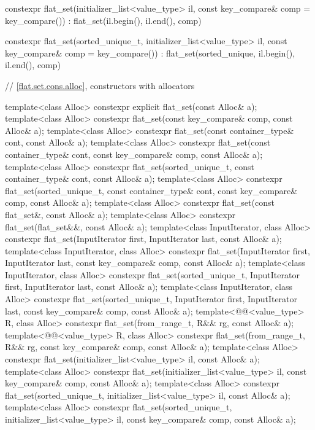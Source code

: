 \begin{codeblock}
{{    constexpr flat_set(initializer_list<value_type> il, const key_compare& comp = key_compare())
      : flat_set(il.begin(), il.end(), comp) { }

    constexpr flat_set(sorted_unique_t, initializer_list<value_type> il,
                       const key_compare& comp = key_compare())
      : flat_set(sorted_unique, il.begin(), il.end(), comp) { }

    // \ref{flat.set.cons.alloc}, constructors with allocators

    template<class Alloc>
      constexpr explicit flat_set(const Alloc& a);
    template<class Alloc>
      constexpr flat_set(const key_compare& comp, const Alloc& a);
    template<class Alloc>
      constexpr flat_set(const container_type& cont, const Alloc& a);
    template<class Alloc>
      constexpr flat_set(const container_type& cont, const key_compare& comp, const Alloc& a);
    template<class Alloc>
      constexpr flat_set(sorted_unique_t, const container_type& cont, const Alloc& a);
    template<class Alloc>
      constexpr flat_set(sorted_unique_t, const container_type& cont,
                         const key_compare& comp, const Alloc& a);
    template<class Alloc>
      constexpr flat_set(const flat_set&, const Alloc& a);
    template<class Alloc>
      constexpr flat_set(flat_set&&, const Alloc& a);
    template<class InputIterator, class Alloc>
      constexpr flat_set(InputIterator first, InputIterator last, const Alloc& a);
    template<class InputIterator, class Alloc>
      constexpr flat_set(InputIterator first, InputIterator last,
                         const key_compare& comp, const Alloc& a);
    template<class InputIterator, class Alloc>
      constexpr flat_set(sorted_unique_t, InputIterator first, InputIterator last,
                         const Alloc& a);
    template<class InputIterator, class Alloc>
      constexpr flat_set(sorted_unique_t, InputIterator first, InputIterator last,
                         const key_compare& comp, const Alloc& a);
    template<@@<value_type> R, class Alloc>
      constexpr flat_set(from_range_t, R&& rg, const Alloc& a);
    template<@@<value_type> R, class Alloc>
      constexpr flat_set(from_range_t, R&& rg, const key_compare& comp, const Alloc& a);
    template<class Alloc>
      constexpr flat_set(initializer_list<value_type> il, const Alloc& a);
    template<class Alloc>
      constexpr flat_set(initializer_list<value_type> il, const key_compare& comp,
                         const Alloc& a);
    template<class Alloc>
      constexpr flat_set(sorted_unique_t, initializer_list<value_type> il, const Alloc& a);
    template<class Alloc>
      constexpr flat_set(sorted_unique_t, initializer_list<value_type> il,
                         const key_compare& comp, const Alloc& a);

}}
\end{codeblock}
